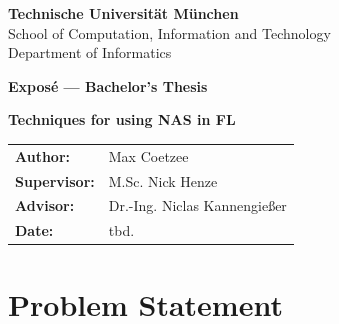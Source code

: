 \documentclass[headsepline,footsepline,footinclude=false,oneside,fontsize=11pt,paper=a4,bibliography=totoc]{scrartcl}
\newcommand*{\getUniversity}{Technische Universität München}
\newcommand*{\getFaculty}{Informatics}
\newcommand*{\getSchool}{Computation, Information and Technology}
\newcommand*{\getTitle}{Techniques for using NAS in FL}
\newcommand*{\getAuthor}{Max Coetzee}
\newcommand*{\getDoctype}{Exposé — Bachelor's Thesis}
\newcommand*{\getSupervisor}{M.Sc. Nick Henze}
\newcommand*{\getAdvisor}{Dr.-Ing. Niclas Kannengießer}
\newcommand*{\getSubmissionDate}{tbd.}
\begin{document}
\begin{titlepage}
    \centering
    
    \vspace*{1cm}
    {\Large\textbf{\getUniversity}\\[0.5em]}
    {\large School of \getSchool\\[0.3em]}
    {\large Department of \getFaculty\\[2cm]}
    
    {\LARGE\textbf{\getDoctype}\\[1cm]}
    
    {\Large\textbf{\getTitle}\\[2cm]}
    
    \begin{tabular}{ll}
        \textbf{Author:} & \getAuthor \\[0.5em]
        \textbf{Supervisor:} & \getSupervisor \\[0.5em]
        \textbf{Advisor:} & \getAdvisor \\[0.5em]
        \textbf{Date:} & \getSubmissionDate \\
    \end{tabular}
    
    \vfill
    
\end{titlepage}

\tableofcontents{}

\newpage

\section{Problem Statement}







\printbibliography{}
\end{document}
